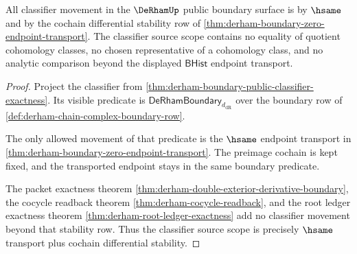 \begin{theorem}
\label{thm:derham-bridge-classifier-source-scope}
All classifier movement in the $\DeRhamUp$ public boundary surface is by
$\hsame$ and by the cochain differential stability row of
\autoref{thm:derham-boundary-zero-endpoint-transport}. The classifier source
scope contains no equality of quotient cohomology classes, no chosen
representative of a cohomology class, and no analytic comparison beyond the
displayed $\mathsf{BHist}$ endpoint transport.
\end{theorem}
\begin{proof}
Project the classifier from
\autoref{thm:derham-boundary-public-classifier-exactness}. Its visible
predicate is $\mathsf{DeRhamBoundary}_{d_{\mathrm{dR}}}$ over the boundary row
of \autoref{def:derham-chain-complex-boundary-row}.

The only allowed movement of that predicate is the $\hsame$ endpoint
transport in \autoref{thm:derham-boundary-zero-endpoint-transport}. The
preimage cochain is kept fixed, and the transported endpoint stays in the same
boundary predicate.

The packet exactness theorem
\autoref{thm:derham-double-exterior-derivative-boundary}, the cocycle
readback theorem \autoref{thm:derham-cocycle-readback}, and the root ledger
exactness theorem \autoref{thm:derham-root-ledger-exactness} add no classifier
movement beyond that stability row. Thus the classifier source scope is
precisely $\hsame$ transport plus cochain differential stability.
\end{proof}


